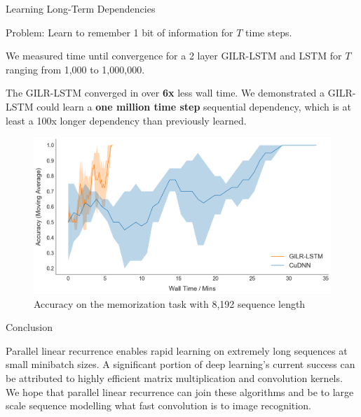 \documentclass[final]{beamer}
\newlength{\onecolwid}
\begin{document}
\begin{frame}[t]
\begin{columns}[t]
\begin{column}{\onecolwid} %

\begin{block}{Learning Long-Term Dependencies}

Problem: Learn to remember 1 bit of information for $T$ time steps.

\vspace{1ex}
We measured time until convergence for a 2 layer GILR-LSTM and LSTM for $T$ ranging from
1,000 to 1,000,000.

\vspace{1ex}
The GILR-LSTM converged in over \textbf{6x} less wall time. We demonstrated a
GILR-LSTM could learn a \textbf{one million time step} sequential dependency, which
is at least a 100x longer dependency than previously learned.

\vspace{2ex}
\begin{figure}
\includegraphics[width=1.0\linewidth]{8k_for_poster.png}
\caption{Accuracy on the memorization task with 8,192 sequence length}
\end{figure}

\end{block}



\begin{block}{Conclusion}

Parallel linear recurrence enables rapid learning on extremely long sequences at small
minibatch sizes. A significant portion of deep learning's current success can be
attributed to highly efficient matrix multiplication and convolution kernels.
We hope that parallel linear recurrence can join these algorithms and
be to large scale sequence
modelling what fast convolution is to image recognition.


\end{block}
\end{column}
\end{columns}
\end{frame}
\end{document}
